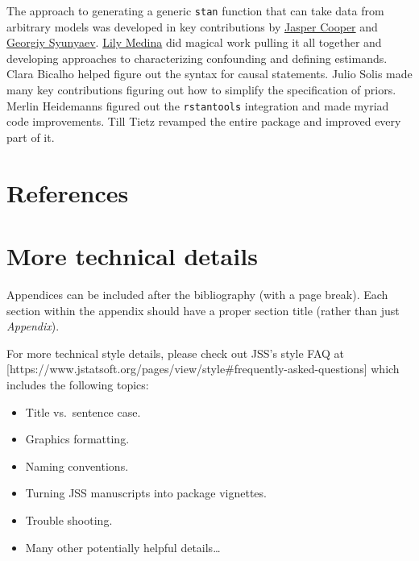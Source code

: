 \documentclass[
  11pt,
  article]{jss}
\providecommand{\tightlist}{%
  \setlength{\itemsep}{0pt}\setlength{\parskip}{0pt}}\usepackage{longtable,booktabs,array}
\begin{document}
\begin{tcolorbox}[enhanced jigsaw, leftrule=.75mm, opacityback=0, rightrule=.15mm, left=2mm, colback=white, arc=.35mm, bottomrule=.15mm, breakable, toprule=.15mm]

The approach to generating a generic \texttt{stan} function that can
take data from arbitrary models was developed in key contributions by
\href{http://jasper-cooper.com/}{Jasper Cooper} and
\href{http://gsyunyaev.com/}{Georgiy Syunyaev}.
\href{https://lilymedina.github.io/}{Lily Medina} did magical work
pulling it all together and developing approaches to characterizing
confounding and defining estimands. Clara Bicalho helped figure out the
syntax for causal statements. Julio Solis made many key contributions
figuring out how to simplify the specification of priors. Merlin
Heidemanns figured out the \texttt{rstantools} integration and made
myriad code improvements. Till Tietz revamped the entire package and
improved every part of it.

\end{tcolorbox}

\hypertarget{references}{%
\section*{References}\label{references}}

\renewcommand{\bibsection}{}


\newpage{}

\hypertarget{sec-techdetails}{%
\section*{More technical details}\label{sec-techdetails}}

\begin{tcolorbox}[enhanced jigsaw, leftrule=.75mm, opacityback=0, rightrule=.15mm, left=2mm, colback=white, arc=.35mm, bottomrule=.15mm, breakable, toprule=.15mm]

Appendices can be included after the bibliography (with a page break).
Each section within the appendix should have a proper section title
(rather than just \emph{Appendix}).

For more technical style details, please check out JSS's style FAQ at
{[}https://www.jstatsoft.org/pages/view/style\#frequently-asked-questions{]}
which includes the following topics:

\begin{itemize}
\tightlist
\item
  Title vs.~sentence case.
\item
  Graphics formatting.
\item
  Naming conventions.
\item
  Turning JSS manuscripts into  package vignettes.
\item
  Trouble shooting.
\item
  Many other potentially helpful details\ldots{}
\end{itemize}

\end{tcolorbox}
\end{document}
